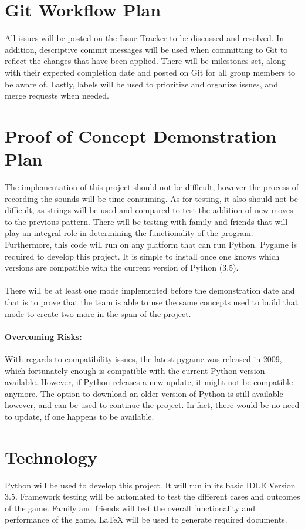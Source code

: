 \documentclass{article}
\begin{document}
\section{Git Workflow Plan}

All issues will be posted on the Issue Tracker to be discussed and resolved. In addition, descriptive commit messages will be used when committing to Git to reflect the changes that have been applied. There will be milestones set, along with their expected completion date and posted on Git for all group members to be aware of. Lastly, labels will be used to prioritize and organize issues, and merge requests when needed.

\section{Proof of Concept Demonstration Plan}

The implementation of this project should not be difficult, however the process of recording the sounds will be time consuming. As for testing, it also should not be difficult, as strings will be used and compared to test the addition of new moves to the previous pattern. There will be testing with family and friends that will play an integral role in determining the functionality of the program. Furthermore, this code will run on any platform that can run Python. Pygame is required to develop this project. It is simple to install once one knows which versions are compatible with the current version of Python (3.5).\\
\\
There will be at least one mode implemented before the demonstration date and that is to prove that the team is able to use the same concepts used to build that mode to create two more in the span of the project.

\paragraph{Overcoming Risks:}
With regards to compatibility issues, the latest pygame was released in 2009, which fortunately enough is compatible with the current Python version available. However, if Python releases a new update, it might not be compatible anymore. The option to download an older version of Python is still available however, and can be used to continue the project. In fact, there would be no need to update, if one happens to be available.

\section{Technology}
Python will be used to develop this project. It will run in its basic IDLE Version 3.5. Framework testing will be automated to test the different cases and outcomes of the game. Family and friends will test the overall functionality and performance of the game. LaTeX will be used to generate required documents.
\end{document}
